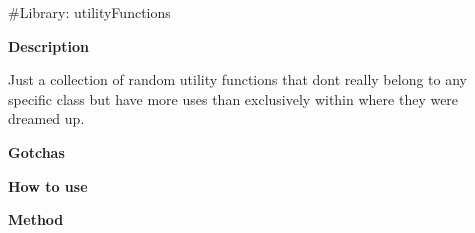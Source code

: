 \#\+Library\+: utility\+Functions

{\bfseries{Description}}

Just a collection of random utility functions that don\textquotesingle{}t really belong to any specific class but have more uses than exclusively within where they were dreamed up.

{\bfseries{Gotchas}}

{\bfseries{How to use}}

{\bfseries{Method}} 